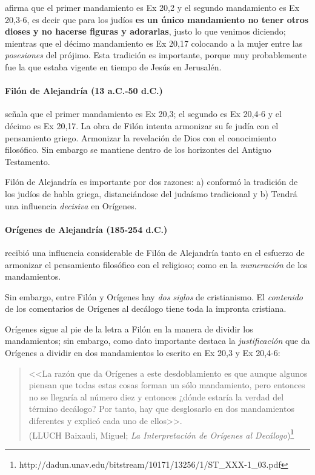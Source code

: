 \documentclass{article}
\begin{document}
afirma que el primer mandamiento es Ex 20,2 y el segundo mandamiento es Ex 20,3-6, es decir que para los judíos \textbf{es un único mandamiento no tener otros dioses y no hacerse figuras y adorarlas}, justo lo que venimos diciendo; mientras que el d\'ecimo mandamiento es Ex 20,17 colocando a la mujer entre las \emph{posesiones} del pr\'ojimo. Esta tradici\'on es importante, porque muy probablemente fue la que estaba vigente en tiempo de Jes\'us en Jerusal\'en.

\paragraph{Fil\'on de Alejandr\'{i}a  (13 a.C.-50 d.C.)}

se\~nala que el primer mandamiento es Ex 20,3; el segundo es Ex 20,4-6 y el d\'ecimo es Ex 20,17. La obra de Fil\'on intenta armonizar su fe jud\'{i}a con el pensamiento griego. Armonizar la revelaci\'on de Dios con el conocimiento filos\'ofico. Sin embargo se mantiene dentro de los horizontes del Antiguo Testamento.

Fil\'on de Alejandr\'{i}a es importante por dos razones: a) conform\'o la tradici\'on de los jud\'{i}os de habla griega, distanci\'andose del juda\'{i}smo tradicional y b) Tendr\'a una influencia \emph{decisiva} en Or\'{i}genes.

\paragraph{Or\'{i}genes de Alejandr\'{i}a (185-254 d.C.)}

recibi\'o una influencia considerable de Fil\'{o}n de Alejandr\'{i}a tanto en el esfuerzo de armonizar el pensamiento filos\'{o}fico con el religioso; como en la \emph{numeraci\'on} de los mandamientos.

Sin embargo, entre Fil\'on y Or\'{i}genes hay \emph{dos siglos} de cristianismo. El \emph{contenido} de los comentarios de Or\'{i}genes al dec\'alogo tiene toda la impronta cristiana.

Or\'{i}genes sigue al pie de la letra a Fil\'on en la manera de dividir los mandamientos; sin embargo, como dato importante destaca la \emph{justificaci\'on} que da Or\'{i}genes a dividir en dos mandamientos lo escrito en Ex 20,3 y Ex 20,4-6:

\begin{quote}
<<La razón que da Orígenes a este desdoblamiento es que aunque
algunos piensan que todas estas cosas forman un sólo mandamiento, pero
entonces no se llegaría al número diez y entonces ¿dónde estaría la verdad
del término decálogo? Por tanto, hay que desglosarlo en dos mandamientos
diferentes y explicó cada uno de ellos>>.\\
(LLUCH Baixauli, Miguel; \emph{La Interpretación de Orígenes al Decálogo})\footnote{http://dadun.unav.edu/bitstream/10171/13256/1/ST\_XXX-1\_03.pdf}
\end{quote}
\end{document}
